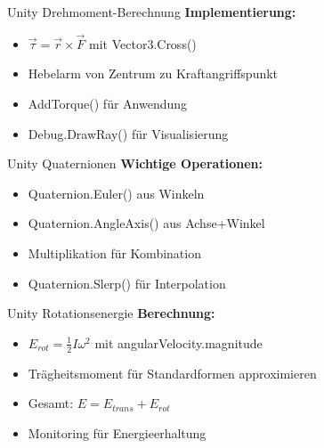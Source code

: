 \begin{concept}{Unity Drehmoment-Berechnung}
    \textbf{Implementierung:}
    \begin{itemize}
        \item $\vec{\tau} = \vec{r} \times \vec{F}$ mit Vector3.Cross()
        \item Hebelarm von Zentrum zu Kraftangriffspunkt
        \item AddTorque() für Anwendung
        \item Debug.DrawRay() für Visualisierung
    \end{itemize}
\end{concept}

\begin{concept}{Unity Quaternionen}
    \textbf{Wichtige Operationen:}
    \begin{itemize}
        \item Quaternion.Euler() aus Winkeln
        \item Quaternion.AngleAxis() aus Achse+Winkel
        \item Multiplikation für Kombination
        \item Quaternion.Slerp() für Interpolation
    \end{itemize}
\end{concept}

\begin{concept}{Unity Rotationsenergie}
    \textbf{Berechnung:}
    \begin{itemize}
        \item $E_{rot} = \frac{1}{2}I\omega^2$ mit angularVelocity.magnitude
        \item Trägheitsmoment für Standardformen approximieren
        \item Gesamt: $E = E_{trans} + E_{rot}$
        \item Monitoring für Energieerhaltung
    \end{itemize}
\end{concept}

\multend

